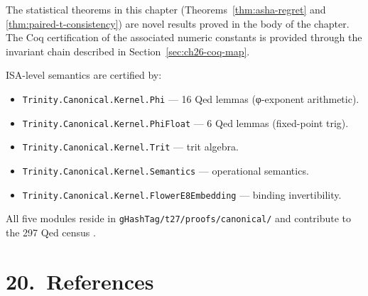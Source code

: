 The statistical theorems in this chapter (Theorems~\ref{thm:asha-regret}
and \ref{thm:paired-t-consistency}) are novel results proved in the body
of the chapter.  The Coq certification of the associated numeric
constants is provided through the invariant chain described in
Section~\ref{sec:ch26-coq-map}.

ISA-level semantics are certified by:
\begin{itemize}
\tightlist
\item \texttt{Trinity.Canonical.Kernel.Phi} --- 16 Qed lemmas (φ-exponent arithmetic).
\item \texttt{Trinity.Canonical.Kernel.PhiFloat} --- 6 Qed lemmas (fixed-point trig).
\item \texttt{Trinity.Canonical.Kernel.Trit} --- trit algebra.
\item \texttt{Trinity.Canonical.Kernel.Semantics} --- operational semantics.
\item \texttt{Trinity.Canonical.Kernel.FlowerE8Embedding} --- binding invertibility.
\end{itemize}

All five modules reside in \texttt{gHashTag/t27/proofs/canonical/} and
contribute to the 297 Qed census \cite{trinity_coq_2024}.

\section{20.\ References}\label{sec:ch26-references}

